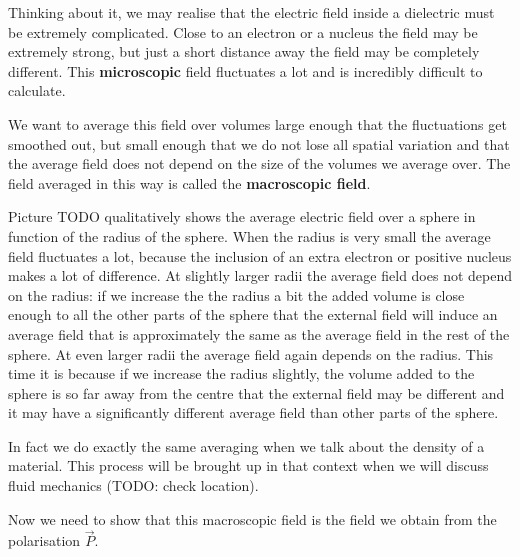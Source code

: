 Thinking about it, we may realise that the electric field inside a dielectric must be extremely complicated. Close to an electron or a nucleus the field may be extremely strong, but just a short distance away the field may be completely different. This \textbf{microscopic} field fluctuates a lot and is incredibly difficult to calculate.
 
We want to average this field over volumes large enough that the fluctuations get smoothed out, but small enough that we do not lose all spatial variation and that the average field does not depend on the size of the volumes we average over. The field averaged in this way is called the \textbf{macroscopic field}.
 
Picture TODO qualitatively shows the average electric field over a sphere in function of the radius of the sphere. When the radius is very small the average field fluctuates a lot, because the inclusion of an extra electron or positive nucleus makes a lot of difference. At slightly larger radii the average field does not depend on the radius: if we increase the the radius a bit the added volume is close enough to all the other parts of the sphere that the external field will induce an average field that is approximately the same as the average field in the rest of the sphere. At even larger radii the average field again depends on the radius. This time it is because if we increase the radius slightly, the volume added to the sphere is so far away from the centre that the external field may be different and it may have a significantly different average field than other parts of the sphere.
 
In fact we do exactly the same averaging when we talk about the density of a material. This process will be brought up in that context when we will discuss fluid mechanics (TODO: check location).
 
Now we need to show that this macroscopic field is the field we obtain from the polarisation $\vec{P}$.

